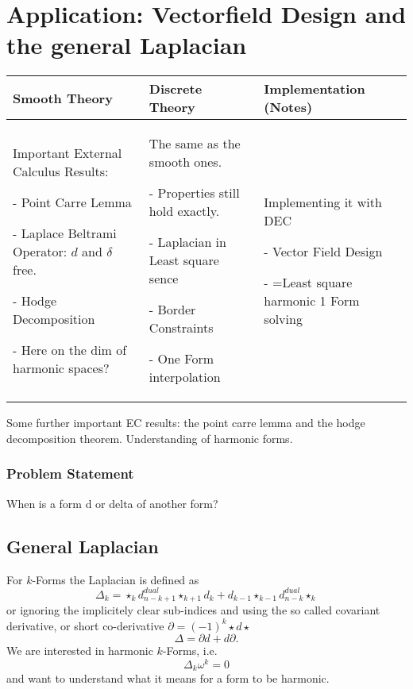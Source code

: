\chapter{Application: Vectorfield Design and the general Laplacian}
	\begin{longtable}{|p{4.5cm}|p{4.5cm}|p{4.5cm}|}
		\hline
		Smooth Theory& Discrete Theory& Implementation (Notes)\\
		\hline
			Important External Calculus Results:
			\begin{packed_enum}
				\item[-] Point Carre Lemma
				\item[-] Laplace Beltrami Operator: $d$ and $\delta$ free.
				\item[-] Hodge Decomposition
				\item[-] Here on the dim of harmonic spaces?
			\end{packed_enum}
			&
			The same as the smooth ones.
			\begin{packed_enum}
				\item[-] Properties still hold exactly.
				\item[-] Laplacian in Least square sence
				\item[-] Border Constraints
				\item[-] One Form interpolation
			\end{packed_enum}
			 & 
			 Implementing it with DEC
			 \begin{packed_enum}
				\item[-] Vector Field Design
				\item[-] =Least square harmonic 1 Form solving
			\end{packed_enum}
			 \\		
		\hline
	\end{longtable}
		
	Some further important EC results: the point carre lemma and the hodge decomposition theorem. Understanding of harmonic forms.
	\subsection{Problem Statement}
		
	
When is a form d or delta of another form?
\section{General Laplacian}
For $k$-Forms the Laplacian is defined as 
\[\Delta_k = \star_{k} d_{n-k+1}^{dual} \star_{k+1}d_k + d_{k-1}\star_{k-1}d_{n-k}^{dual} \star_{k}\]
or ignoring the implicitely clear sub-indices and using the so called covariant derivative, or short co-derivative  $\partial = (-1)^k\star d \star$ 
\[\Delta = \partial d + d \partial .\]
We are interested in harmonic $k$-Forms, i.e.
\[\Delta_k \omega^k = 0\]
and want to understand what it means for a form to be harmonic. 

